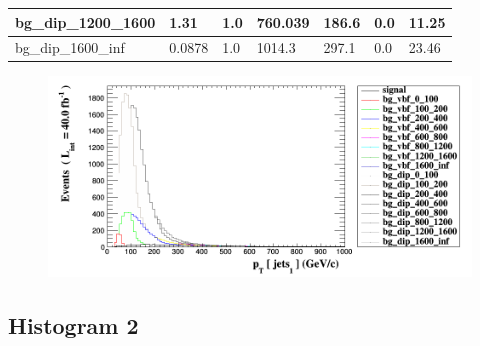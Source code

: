 \documentclass[a4paper, 10pt]{article}
\begin{document}
\begin{table}[H]
\begin{center}
\begin{tabular}{|m{23.0mm}|m{23.0mm}|m{18.0mm}|m{19.0mm}|m{19.0mm}|m{19.0mm}|m{19.0mm}|}
      \hline
      {\cellcolor{white}         bg\_dip\_1200\_1600}& {\cellcolor{white}         1.31}& {\cellcolor{white}         1.0}& {\cellcolor{white}         760.039}& {\cellcolor{white}         186.6}& {\cellcolor{orange}         0.0}& {\cellcolor{orange}         11.25}\\
      \hline
      {\cellcolor{white}         bg\_dip\_1600\_inf}& {\cellcolor{white}         0.0878}& {\cellcolor{white}         1.0}& {\cellcolor{white}         1014.3}& {\cellcolor{white}         297.1}& {\cellcolor{red}         0.0}& {\cellcolor{red}         23.46}\\
\hline
    \end{tabular}
  \end{center}
\end{table}

\begin{figure}[H]
  \begin{center}
    \includegraphics[scale=0.45]{selection_0.png}\\
\caption{   }
  \end{center}
\end{figure}
      \newpage
\subsection{ Histogram 2}
\end{document}
